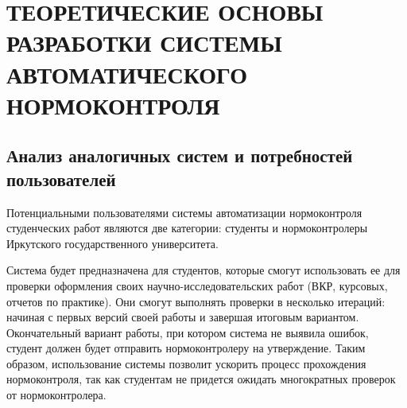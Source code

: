 \documentclass{report}
\begin{document}


\setcounter{section}{0} 
\setcounter{subsection}{0}
\setcounter{equation}{0}

\chapter{ТЕОРЕТИЧЕСКИЕ ОСНОВЫ РАЗРАБОТКИ СИСТЕМЫ АВТОМАТИЧЕСКОГО НОРМОКОНТРОЛЯ}


\section{Анализ аналогичных систем и потребностей пользователей}

Потенциальными пользователями  системы автоматизации нормоконтроля студенческих работ являются две категории: студенты и нормоконтролеры Иркутского государственного университета.

Система будет предназначена для студентов, которые смогут использовать ее для проверки оформления своих научно-исследовательских работ (ВКР, курсовых, отчетов по практике). Они смогут выполнять проверки в несколько итераций: начиная с первых версий своей работы и завершая итоговым вариантом. Окончательный вариант работы, при котором система не выявила ошибок, студент должен будет отправить нормоконтролеру на утверждение. Таким образом, использование системы позволит ускорить процесс прохождения нормоконтроля, так как студентам не придется ожидать многократных проверок от нормоконтролера.
\end{document}
